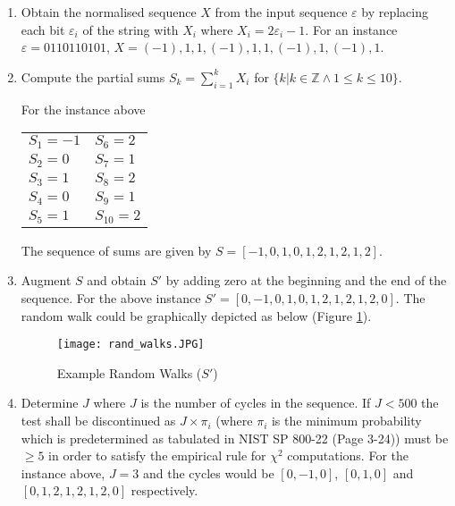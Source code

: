 \begin{enumerate}
    \item Obtain the normalised sequence $X$ from the input sequence $\varepsilon$ by replacing each bit $\varepsilon_i$ of the string with $X_i$ where $X_i=2\varepsilon_i-1$. For an instance $\varepsilon=0110110101$, $X=(-1), 1, 1, (-1), 1, 1, (-1), 1, (-1), 1$.
    
    \item Compute the partial sums $S_k=\sum_{i=1}^{k}X_i$ for $\{k\lvert k \in \mathbb{Z}\land 1 \leq k \leq 10\}$.
    
    For the instance above
    
    \begin{table}[h!]
        \centering
        \begin{tabular}{ll}
            $S_1=-1$ & $S_6=2$ \\
            $S_2=0$ & $S_7=1$ \\
            $S_3=1$ & $S_8=2$ \\
            $S_4=0$ & $S_9=1$ \\
            $S_5=1$ & $S_{10}=2$
        \end{tabular}
    \end{table}
    
    The sequence of sums are given by $S=[-1, 0, 1, 0, 1, 2, 1, 2, 1, 2]$.
    
    \item Augment $S$ and obtain $S'$ by adding zero at the beginning and the end of the sequence. For the above instance $S'=[0, -1, 0, 1, 0, 1, 2, 1, 2, 1, 2, 0]$. The random walk could be graphically depicted as below (Figure \ref{fig:ret1_walks}).
    
    \begin{figure}[h!]
        \texttt{[image: rand\_walks.JPG]}
        \centering
        \caption{Example Random Walks ($S'$)}
        \label{fig:ret1_walks}
    \end{figure}
    
    \item Determine $J$ where $J$ is the number of cycles in the sequence. If $J<500$ the test shall be discontinued as $J\times\pi_i$ (where $\pi_i$ is the minimum probability which is predetermined as tabulated in NIST SP 800-22 (Page 3-24))\cite{rep_nist_sp_80022} must be $\geq5$ in order to satisfy the empirical rule for $\chi^2$ computations. For the instance above, $J=3$ and the cycles would be $[0, -1, 0]$, $[0, 1, 0]$ and $[0, 1, 2, 1, 2, 1, 2, 0]$ respectively.
    

\end{enumerate}
